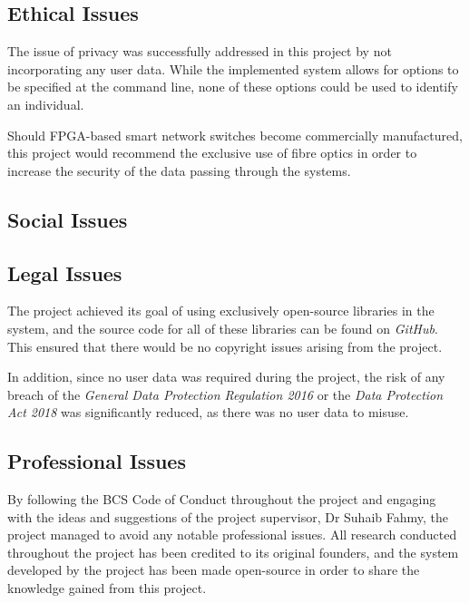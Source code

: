
\subsection{Ethical Issues}
The issue of privacy was successfully addressed in this project by not incorporating any user data. While the implemented system allows for options to be specified at the command line, none of these options could be used to identify an individual.

Should FPGA-based smart network switches become commercially manufactured, this project would recommend the exclusive use of fibre optics in order to increase the security of the data passing through the systems.

\subsection{Social Issues}


\subsection{Legal Issues}
The project achieved its goal of using exclusively open-source libraries in the system, and the source code for all of these libraries can be found on \textit{GitHub}.
This ensured that there would be no copyright issues arising from the project.

In addition, since no user data was required during the project, the risk of any breach of the \textit{General Data Protection Regulation 2016} \cite{eu_2016_679} or the \textit{Data Protection Act 2018} \cite{uk_dpa_2018} was significantly reduced, as there was no user data to misuse.

\subsection{Professional Issues}

By following the BCS Code of Conduct \cite{bcs_code_of_conduct} throughout the project and engaging with the ideas and suggestions of the project supervisor, Dr Suhaib Fahmy, the project managed to avoid any notable professional issues. All research conducted throughout the project has been credited to its original founders, and the system developed by the project has been made open-source in order to share the knowledge gained from this project.

